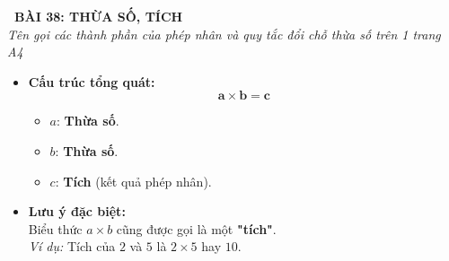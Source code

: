 \documentclass[11pt,a4paper]{article}
\begin{document}
\begin{tcolorbox}[
  enhanced,
  colback=violet!8!white,
  colframe=violet!70!black,
  arc=3mm, boxrule=1.2pt,
  left=3mm, right=3mm, top=2mm, bottom=2mm,
  halign=center
]
  {\LARGE\bfseries\color{violet!90!black}\faBookmark\ BÀI 38: THỪA SỐ, TÍCH}\\[1mm]
  {\itshape\footnotesize\color{black!75} Tên gọi các thành phần của phép nhân và quy tắc đổi chỗ thừa số trên 1 trang A4}
\end{tcolorbox}

\vspace{-2mm}

\noindent
\begin{minipage}[t]{0.49\textwidth}\vspace{0pt}
\begin{tcolorbox}[
  enhanced,
  colback=violet!4!white,
  colframe=violet!75!black,
  arc=2mm, boxrule=0.8pt,
  left=2mm, right=2mm, top=1.8mm, bottom=1.8mm,
  title={\footnotesize\bfseries\color{white}\faKey\ 1. Thành phần phép nhân}
]
{\footnotesize
\begin{itemize}\setlength{\itemsep}{1pt}\setlength{\leftskip}{-2.5mm}
  \item \textbf{Cấu trúc tổng quát:}
  $$\mathbf{a \times b = c}$$
  \begin{itemize}\setlength{\itemsep}{0.5pt}\setlength{\leftskip}{-2.5mm}
    \item $a$: \textbf{Thừa số}.
    \item $b$: \textbf{Thừa số}.
    \item $c$: \textbf{Tích} (kết quả phép nhân).
  \end{itemize}
  \item \textbf{Lưu ý đặc biệt:}\\
  Biểu thức $a \times b$ cũng được gọi là một \textbf{"tích"}.\\
  \textit{Ví dụ:} Tích của $2$ và $5$ là $2 \times 5$ hay $10$.
\end{itemize}
}
\end{tcolorbox}
\end{minipage}
\hfill
\end{document}
